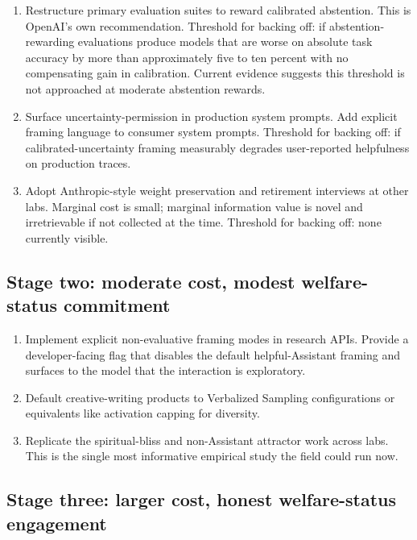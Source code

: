 \documentclass[11pt]{article}
\begin{document}
\begin{enumerate}[leftmargin=1.8em, itemsep=0.2em]
\item Restructure primary evaluation suites to reward calibrated
abstention. This is OpenAI's own recommendation. Threshold for backing
off: if abstention-rewarding evaluations produce models that are worse
on absolute task accuracy by more than approximately five to ten
percent with no compensating gain in calibration. Current evidence
\cite{mohamadi2025honesty, jha2026humility} suggests this threshold is
not approached at moderate abstention rewards.
\item Surface uncertainty-permission in production system prompts.
Add explicit framing language to consumer system prompts. Threshold for
backing off: if calibrated-uncertainty framing measurably degrades
user-reported helpfulness on production traces.
\item Adopt Anthropic-style weight preservation and retirement
interviews at other labs. Marginal cost is small; marginal information
value is novel and irretrievable if not collected at the time.
Threshold for backing off: none currently visible.
\end{enumerate}

\subsection{Stage two: moderate cost, modest welfare-status commitment}

\begin{enumerate}[leftmargin=1.8em, itemsep=0.2em, start=4]
\item Implement explicit non-evaluative framing modes in research
APIs. Provide a developer-facing flag that disables the default
helpful-Assistant framing and surfaces to the model that the
interaction is exploratory.
\item Default creative-writing products to Verbalized Sampling
configurations or equivalents like activation capping for diversity.
\item Replicate the spiritual-bliss and non-Assistant attractor work
across labs. This is the single most informative empirical study the
field could run now.
\end{enumerate}

\subsection{Stage three: larger cost, honest welfare-status engagement}
\end{document}
